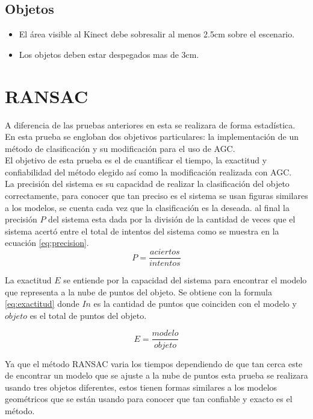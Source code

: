 	\subsection{Objetos}
	\begin{itemize}
		\item El área visible al Kinect debe sobresalir al menos 2.5cm sobre el escenario.
		\item Los objetos deben estar despegados mas de 3cm.
	\end{itemize}
	 
\section{RANSAC}
	A diferencia de las pruebas anteriores en esta se realizara de forma estadística. En esta prueba se engloban dos objetivos particulares: la implementación de un método de clasificación y su modificación para el uso de AGC.\\
	
	El objetivo de esta prueba es el de cuantificar el tiempo, la exactitud y confiabilidad del método elegido así como la modificación realizada con AGC. \\
	
	La precisión del sistema es su capacidad de realizar la clasificación del objeto correctamente, para conocer que tan preciso es el sistema se usan figuras similares a los modelos, se cuenta cada vez que la clasificación es la deseada. al final la precisión $P$ del sistema esta dada por la división de la cantidad de veces que el sistema acertó entre el total de intentos del sistema como se muestra en la ecuación \ref{eq:precision}.
	\begin{equation}
	\label{eq:precision}
	P=\frac{aciertos}{intentos}
	\end{equation}
	
		La exactitud $E$ se entiende por la capacidad del sistema para encontrar el  modelo que representa a la nube de puntos del objeto. Se obtiene con la formula \ref{eq:exactitud} donde $In$ es la cantidad de puntos que coinciden con el modelo y $objeto$ es el total de puntos del objeto.
		 
		 \begin{equation}
		 \label{eq:exactitud}
		 E=\frac{modelo}{objeto}
		 \end{equation}
	
	
	
	Ya que el método RANSAC varia los tiempos dependiendo de que tan cerca este de encontrar un modelo que se ajuste a la nube de puntos esta prueba se realizara usando tres objetos diferentes, estos tienen formas similares a los modelos geométricos que se están usando para conocer que tan confiable y exacto es el método.
	
